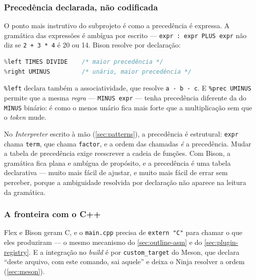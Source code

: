 \subsubsection{Precedência declarada, não codificada}

O ponto mais instrutivo do subprojeto é como a precedência é expressa. A
gramática das expressões é ambígua por escrito --- \texttt{expr : expr PLUS
expr} não diz se \texttt{2 + 3 * 4} é 20 ou 14. Bison resolve por declaração:

\begin{lstlisting}[style=bt, language=C++,
    caption={Declaradas de baixo para cima: quem vem depois tem precedência maior.}]
%left PLUS MINUS      /* menor precedência */
%left TIMES DIVIDE    /* maior precedência */
%right UMINUS         /* unário, maior precedência */
\end{lstlisting}

\texttt{\%left} declara também a associatividade, que resolve
\texttt{a - b - c}. E \texttt{\%prec UMINUS} permite que a mesma
\emph{regra} --- \texttt{MINUS expr} --- tenha precedência diferente da do
\texttt{MINUS} binário: é como o menos unário fica mais forte que a
multiplicação sem que o \emph{token} mude.

\begin{porque}
No \emph{Interpreter} escrito à mão (\cref{sec:patterns}), a precedência é
estrutural: \texttt{expr} chama \texttt{term}, que chama \texttt{factor}, e a
ordem das chamadas \emph{é} a precedência. Mudar a tabela de precedência exige
reescrever a cadeia de funções. Com Bison, a gramática fica plana e ambígua de
propósito, e a precedência é uma tabela declarativa --- muito mais fácil de
ajustar, e muito mais fácil de errar sem perceber, porque a ambiguidade
resolvida por declaração não aparece na leitura da gramática.
\end{porque}

\subsubsection{A fronteira com o C++}

Flex e Bison geram C, e o \texttt{main.cpp} precisa de \texttt{extern "C"} para
chamar o que eles produziram --- o mesmo mecanismo do \cref{sec:outline-asm} e
do \cref{sec:plugin-registry}. E a integração no \emph{build} é por
\texttt{custom\_target} do Meson, que declara ``deste arquivo, com este comando,
sai aquele'' e deixa o Ninja resolver a ordem
(\cref{sec:meson}).

